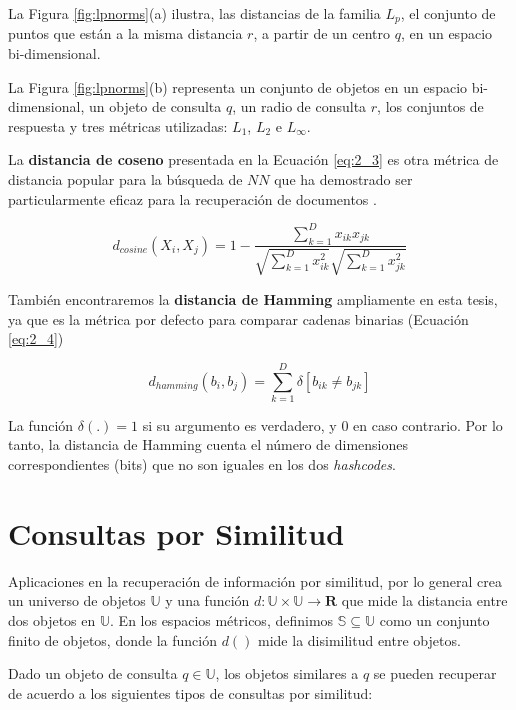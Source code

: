La Figura \ref{fig:lpnorms}(a)  ilustra,  las distancias de la familia  $L_p$, el conjunto de puntos que están a la misma distancia $r$, a partir de un centro $q$, en un  espacio bi-dimensional.

La Figura \ref{fig:lpnorms}(b) representa un conjunto de objetos en un  espacio bi-dimensional, un objeto de consulta $q$, un radio de consulta $r$, los conjuntos de respuesta y tres métricas utilizadas: $L_1$, $L_2$ e $L_{\infty}$.

La \textbf{distancia de coseno} presentada en la Ecuación \ref{eq:2_3} es otra métrica de distancia popular para la búsqueda de $NN$ que ha demostrado ser particularmente eficaz para la recuperación de documentos \cite{Manning,Ravichandran}.

\begin{equation}\label{eq:2_3}
	    d_{cosine}(X_i,X_j) = 1 - \frac{\sum\nolimits_{k=1}^{D} x_{ik} x_{jk}}{\sqrt{\sum\nolimits_{k=1}^{D} x_{ik}^2}\sqrt{\sum\nolimits_{k=1}^{D} x_{jk}^2}}
\end{equation}

También encontraremos la \textbf{distancia de Hamming} ampliamente en esta tesis, ya que es la métrica por defecto para comparar cadenas binarias (Ecuación \ref{eq:2_4})

\begin{equation}\label{eq:2_4}
	   d_{hamming}(b_i,b_j) = \sum_{k=1}^{D} \delta[b_{ik} \neq b_{jk}]
\end{equation}

La función $\delta(.) = 1$ si su argumento es verdadero, y 0 en caso contrario. Por lo tanto, la distancia de Hamming cuenta el número de dimensiones correspondientes (bits) que no son iguales en los dos \textit{hashcodes}. \\

\section{Consultas por Similitud}\label{sec:consultas-similaridade}

Aplicaciones en la recuperación de información por similitud, por lo general crea un universo de objetos $\mathbb{U}$  y una función $d: \mathbb{U} \times \mathbb{U} \rightarrow \mathbf{R} $ que mide la distancia entre dos objetos en $\mathbb{U} $. En los espacios métricos, definimos $\mathbb{S} \subseteq \mathbb{U} $ como un conjunto finito de objetos, donde la función $d()$ mide la disimilitud entre objetos.

Dado un objeto de consulta $q \in \mathbb{U} $,  los objetos similares a $q$  se pueden recuperar de acuerdo a los siguientes tipos de consultas por similitud:

